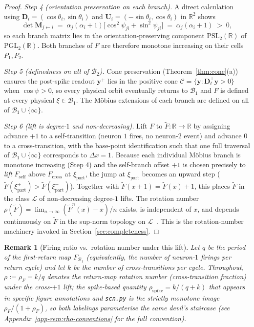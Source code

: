 \documentclass[12pt]{article}
\newcommand{\vv}[1]{\mathbf{#1}}
\newcommand{\DD}{\vv{D}}
\newcommand{\yy}{\vv{y}}
\newcommand{\RR}{\mathbb{R}}
\newcommand{\Bsp}{\mathcal{B}}
\newtheorem{remark}{Remark}
\begin{document}
\begin{proof}
\emph{Step 4 (orientation preservation on each branch).} A direct calculation using $\DD_i=(\cos\theta_i,\sin\theta_i)$ and $\vv{U}_i=(-\sin\theta_i,\cos\theta_i)$ in $\RR^2$ shows
\begin{equation}\label{eq:det-M}
\det\vv{M}_{j\leftarrow i}\;=\;\alpha_j(\alpha_i+1)\bigl[\cos^2\psi_{ji}+\sin^2\psi_{ji}\bigr]\;=\;\alpha_j(\alpha_i+1)\;>\;0,
\end{equation}
so each branch matrix lies in the orientation-preserving component $\mathrm{PSL}_2(\RR)$ of $\mathrm{PGL}_2(\RR)$. Both branches of $F$ are therefore monotone increasing on their cells $P_1, P_2$.

\emph{Step 5 (definedness on all of $\Bsp_2$).} Cone preservation (Theorem~\ref{thm:cone}(a)) ensures the post-spike readout $\yy^+$ lies in the positive cone $\mathcal{C}=\{\yy:\DD_\ell^\top\yy>0\}$ when $\cos\psi>0$, so every physical orbit eventually returns to $\Bsp_1$ and $F$ is defined at every physical $\xi\in\Bsp_1$. The M\"obius extensions of each branch are defined on all of $\Bsp_1\cup\{\infty\}$.

\emph{Step 6 (lift is degree-$1$ and non-decreasing).} Lift $F$ to $\widetilde F:\RR\to\RR$ by assigning advance $+1$ to a self-transition (neuron $1$ fires, no neuron-$2$ event) and advance $0$ to a cross-transition, with the base-point identification such that one full traversal of $\Bsp_1\cup\{\infty\}$ corresponds to $\Delta x=1$. Because each individual M\"obius branch is monotone increasing (Step 4) and the self-branch offset $+1$ is chosen precisely to \emph{lift} $F_{\text{self}}$ above $F_{\text{cross}}$ at $\xi_{\mathrm{part}}$, the jump at $\xi_{\mathrm{part}}$ becomes an upward step ($\widetilde F(\xi_{\mathrm{part}}^+)>\widetilde F(\xi_{\mathrm{part}}^-)$). Together with $\widetilde F(x+1)=\widetilde F(x)+1$, this places $\widetilde F$ in the class $\mathcal{L}$ of non-decreasing degree-$1$ lifts. The rotation number $\rho(\widetilde F)=\lim_{n\to\infty}(\widetilde F^n(x)-x)/n$ exists, is independent of $x$, and depends continuously on $\widetilde F$ in the sup-norm topology on $\mathcal{L}$~\citep{rhodes1991topologies,alseda2000combinatorial}. This is the rotation-number machinery invoked in Section~\ref{sec:completeness}.
\end{proof}

\begin{remark}[Firing ratio vs.\ rotation number under this lift]\label{rem:rho-conventions} Let $q$ be the period of the first-return map $F_{\!\Bsp_1}$ (equivalently, the number of neuron-$1$ firings per return cycle) and let $k$ be the number of cross-transitions per cycle. Throughout, $\rho:=\rho_F=k/q$ denotes the return-map rotation number (cross-transition fraction) under the cross-$+1$ lift; the spike-based quantity $\rho_{\text{spike}}=k/(q+k)$ that appears in specific figure annotations and \texttt{scn.py} is the strictly monotone image $\rho_F/(1+\rho_F)$, so both labelings parameterise the same devil's staircase (see Appendix~\ref{app-rem:rho-conventions} for the full convention). \end{remark}
\end{document}
